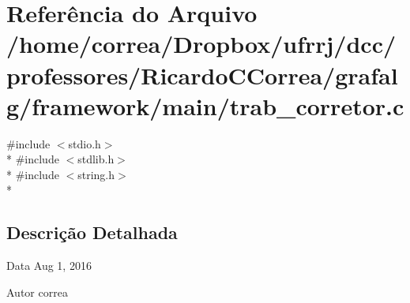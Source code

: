 \section{Referência do Arquivo /home/correa/\+Dropbox/ufrrj/dcc/professores/\+Ricardo\+C\+Correa/grafalg/framework/main/trab\+\_\+corretor.c}
\label{trab__corretor_8c}
{\ttfamily \#include $<$stdio.\+h$>$}\\*
{\ttfamily \#include $<$stdlib.\+h$>$}\\*
{\ttfamily \#include $<$string.\+h$>$}\\*


\subsection{Descrição Detalhada}
\begin{DoxyDate}{Data}
Aug 1, 2016 
\end{DoxyDate}
\begin{DoxyAuthor}{Autor}
correa 
\end{DoxyAuthor}
